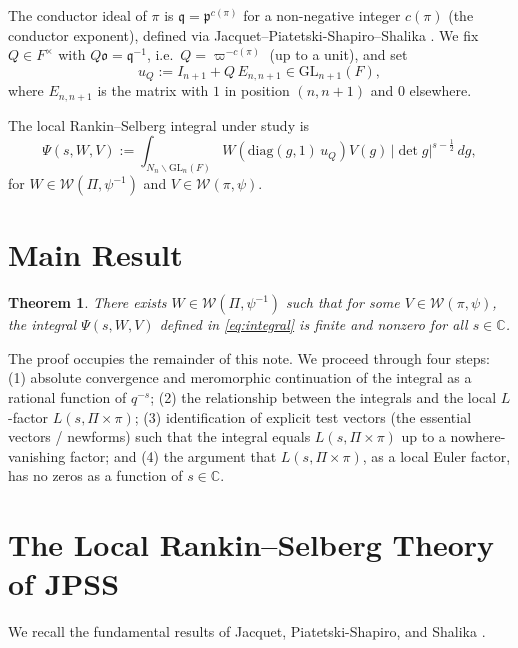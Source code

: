\documentclass[12pt]{article}
\newtheorem{theorem}{Theorem}
\begin{document}
The conductor ideal of $\pi$ is $\mathfrak{q} = \mathfrak{p}^{c(\pi)}$ for a
non-negative integer $c(\pi)$ (the conductor exponent), defined via
Jacquet--Piatetski-Shapiro--Shalika \cite{JPSS83}.  We fix $Q \in F^\times$
with $Q\mathfrak{o} = \mathfrak{q}^{-1}$, i.e.\ $Q = \varpi^{-c(\pi)}$ (up to
a unit), and set
\begin{equation}\label{eq:uQ}
  u_Q := I_{n+1} + Q\,E_{n,n+1} \in \mathrm{GL}_{n+1}(F),
\end{equation}
where $E_{n,n+1}$ is the matrix with $1$ in position $(n,n+1)$ and $0$
elsewhere.

The local Rankin--Selberg integral under study is
\begin{equation}\label{eq:integral}
  \Psi(s, W, V) := \int_{N_n\backslash \mathrm{GL}_n(F)}
    W\!\left(\mathrm{diag}(g,1)\,u_Q\right) V(g)\,|\det g|^{s-\frac{1}{2}}\,dg,
\end{equation}
for $W \in \mathcal{W}(\Pi,\psi^{-1})$ and $V \in \mathcal{W}(\pi,\psi)$.

\section{Main Result}

\begin{theorem}\label{thm:main}
There exists $W \in \mathcal{W}(\Pi,\psi^{-1})$ such that for some
$V \in \mathcal{W}(\pi,\psi)$, the integral $\Psi(s,W,V)$ defined in
\eqref{eq:integral} is finite and nonzero for all $s \in \mathbb{C}$.
\end{theorem}

The proof occupies the remainder of this note.  We proceed through four steps:
(1) absolute convergence and meromorphic continuation of the integral as a
rational function of $q^{-s}$; (2) the relationship between the integrals and
the local $L$-factor $L(s,\Pi\times\pi)$; (3) identification of explicit test
vectors (the essential vectors / newforms) such that the integral equals
$L(s,\Pi\times\pi)$ up to a nowhere-vanishing factor; and (4) the argument
that $L(s,\Pi\times\pi)$, as a local Euler factor, has no zeros as a function
of $s \in \mathbb{C}$.

\section{The Local Rankin--Selberg Theory of JPSS}

We recall the fundamental results of Jacquet, Piatetski-Shapiro, and Shalika
\cite{JPSS83}.
\end{document}
